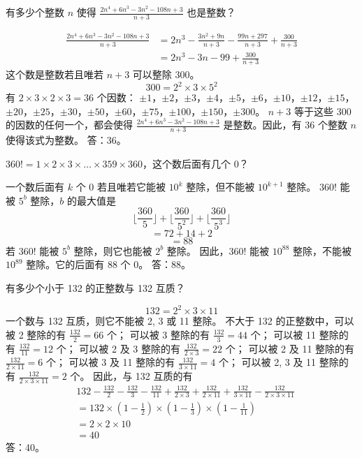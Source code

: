 \begin{questions}
\question 有多少个整数 $n$ 使得 $\frac{2n^4 + 6n^3 - 3n^2 - 108n + 3}{n+3}$ 也是整数？

\begin{solution}
\begin{align}
\frac{2n^4 + 6n^3 - 3n^2 - 108n + 3}{n+3} &= 2n^3 - \frac{3n^2 + 9n}{n+3} - \frac{99n + 297}{n+3} + \frac{300}{n+3} \\
&= 2n^3 - 3n - 99 + \frac{300}{n+3}
\end{align}
这个数是整数若且唯若 $n+3$ 可以整除 $300$。
\[
300 = 2^2 \times 3 \times 5^2
\]
有 $2 \times 3 \times 2 \times 3 = 36$ 个因数：
$\pm 1$，$\pm 2$，$\pm 3$，$\pm 4$，$\pm 5$，$\pm 6$，$\pm 10$，$\pm 12$，$\pm 15$，$\pm 20$，$\pm 25$，$\pm 30$，$\pm 50$，$\pm 60$，$\pm 75$，$\pm 100$，$\pm 150$，$\pm 300$。
$n+3$ 等于这些 $300$ 的因数的任何一个，都会使得 $\frac{2n^4 + 6n^3 - 3n^2 - 108n + 3}{n+3}$ 是整数。因此，有 $36$ 个整数 $n$ 使得该式为整数。
答：36。
\end{solution}

\question $360! = 1 \times 2 \times 3 \times \dots \times 359 \times 360$，这个数后面有几个 $0$？

\begin{solution}
一个数后面有 $k$ 个 $0$ 若且唯若它能被 $10^k$ 整除，但不能被 $10^{k+1}$ 整除。
$360!$ 能被 $5^b$ 整除，$b$ 的最大值是
\[
\lfloor \frac{360}{5} \rfloor + \lfloor \frac{360}{5^2} \rfloor + \lfloor \frac{360}{5^3} \rfloor
\]
\[
= 72 + 14 + 2
\]
\[
= 88
\]
若 $360!$ 能被 $5^b$ 整除，则它也能被 $2^b$ 整除。
因此，$360!$ 能被 $10^{88}$ 整除，不能被 $10^{89}$ 整除。它的后面有 $88$ 个 $0$。
答：88。
\end{solution}

\question 有多少个小于 132 的正整数与 132 互质？

\begin{solution}
\[
132 = 2^2 \times 3 \times 11
\]
一个数与 132 互质，则它不能被 2, 3 或 11 整除。
不大于 132 的正整数中，可以被 2 整除的有 $\frac{132}{2} = 66$ 个；
可以被 3 整除的有 $\frac{132}{3} = 44$ 个；
可以被 11 整除的有 $\frac{132}{11} = 12$ 个；
可以被 2 及 3 整除的有 $\frac{132}{2 \times 3} = 22$ 个；
可以被 2 及 11 整除的有 $\frac{132}{2 \times 11} = 6$ 个；
可以被 3 及 11 整除的有 $\frac{132}{3 \times 11} = 4$ 个；
可以被 2, 3 及 11 整除的有 $\frac{132}{2 \times 3 \times 11} = 2$ 个。
因此，与 132 互质的有
\begin{align}
&132 - \frac{132}{2} - \frac{132}{3} - \frac{132}{11} + \frac{132}{2 \times 3} + \frac{132}{2 \times 11} + \frac{132}{3 \times 11} - \frac{132}{2 \times 3 \times 11} \\
&= 132 \times \left( 1 - \frac{1}{2} \right) \times \left( 1 - \frac{1}{3} \right) \times \left( 1 - \frac{1}{11} \right) \\
&= 2 \times 2 \times 10 \\
&= 40
\end{align}
答：40。
\end{solution}


\end{questions}
